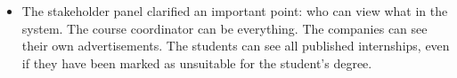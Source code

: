 \documentclass{l3deliverable}
\begin{document}
\begin{itemize}
\item The stakeholder panel clarified an important point: who can view what
in the system. The course coordinator can be everything. The companies can see
their own advertisements. The students can see all published internships, even
if they have been marked as unsuitable for the student's degree.
\end{itemize}

\end{document}
